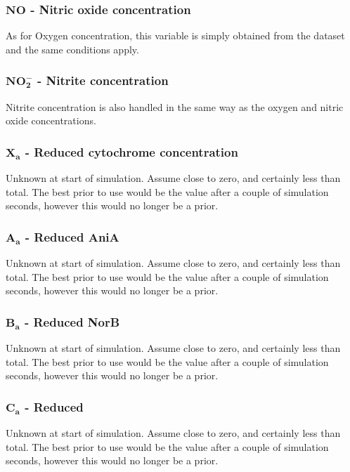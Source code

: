 \subsubsection*{$\mathbf{NO}$ {\bf- Nitric oxide concentration}}
As for Oxygen concentration, this variable is simply obtained from the dataset and the same conditions apply.

\subsubsection*{$\mathbf{NO_2^-}$ {\bf- Nitrite concentration}}
Nitrite concentration is also handled in the same way as the oxygen and nitric oxide concentrations.

\subsubsection*{$\mathbf{X_a}$ {\bf- Reduced cytochrome concentration}}
Unknown at start of simulation. Assume close to zero, and certainly less than total. The best prior to use would be the value after a couple of simulation seconds, however this would no longer be a prior.

\subsubsection*{$\mathbf{A_a}$ {\bf- Reduced AniA}}
Unknown at start of simulation. Assume close to zero, and certainly less than total. The best prior to use would be the value after a couple of simulation seconds, however this would no longer be a prior.

\subsubsection*{$\mathbf{B_a}$ {\bf- Reduced NorB}}
Unknown at start of simulation. Assume close to zero, and certainly less than total. The best prior to use would be the value after a couple of simulation seconds, however this would no longer be a prior.

\subsubsection*{$\mathbf{C_a}$ {\bf- Reduced \cbbthree{}}}
Unknown at start of simulation. Assume close to zero, and certainly less than total. The best prior to use would be the value after a couple of simulation seconds, however this would no longer be a prior.


